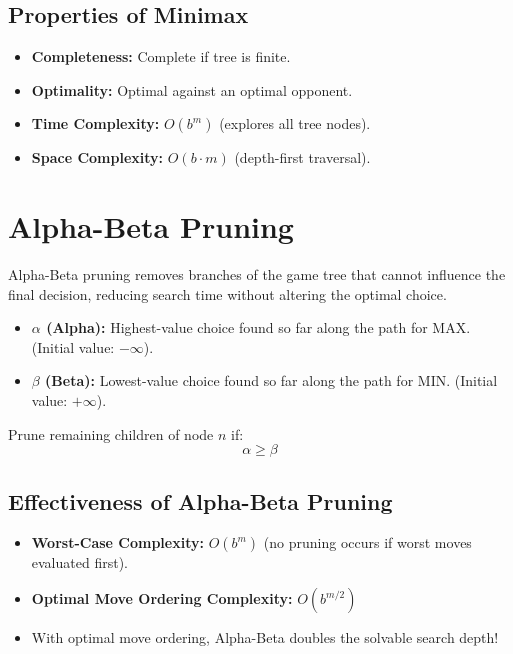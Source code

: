 \documentclass[12pt,a4paper]{article}
\begin{document}
\subsection{Properties of Minimax}
\begin{itemize}[leftmargin=*, itemsep=3pt]
  \item \textbf{Completeness:} Complete if tree is finite.
  \item \textbf{Optimality:} Optimal against an optimal opponent.
  \item \textbf{Time Complexity:} $O(b^m)$ (explores all tree nodes).
  \item \textbf{Space Complexity:} $O(b \cdot m)$ (depth-first traversal).
\end{itemize}

\section{Alpha-Beta Pruning}

Alpha-Beta pruning removes branches of the game tree that cannot influence the final decision, reducing search time without altering the optimal choice.

\begin{tcolorbox}[defbox, title={Definition of Alpha ($\alpha$) and Beta ($\beta$)}]
  \begin{itemize}[leftmargin=*, noitemsep]
    \item \textbf{$\alpha$ (Alpha):} Highest-value choice found so far along the path for MAX. (Initial value: $-\infty$).
    \item \textbf{$\beta$ (Beta):} Lowest-value choice found so far along the path for MIN. (Initial value: $+\infty$).
  \end{itemize}
\end{tcolorbox}

\begin{tcolorbox}[formulabox, title={Alpha-Beta Pruning Condition}]
  Prune remaining children of node $n$ if:
  \begin{equation}
    \alpha \ge \beta
  \end{equation}
\end{tcolorbox}

\subsection{Effectiveness of Alpha-Beta Pruning}
\begin{itemize}[leftmargin=*, itemsep=3pt]
  \item \textbf{Worst-Case Complexity:} $O(b^m)$ (no pruning occurs if worst moves evaluated first).
  \item \textbf{Optimal Move Ordering Complexity:} $O(b^{m/2})$
  \item With optimal move ordering, Alpha-Beta doubles the solvable search depth!
\end{itemize}
\end{document}
